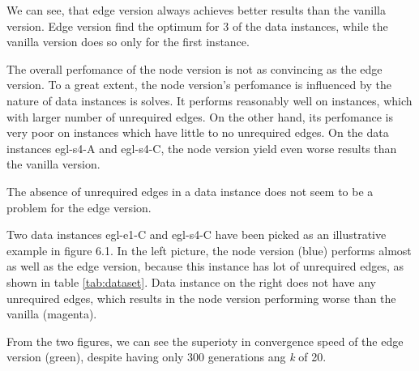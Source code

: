\documentclass[twoside]{ctuthesis}
\theoremstyle{plain}
\theoremstyle{definition}
\theoremstyle{note}
\begin{document}
We can see, that edge version always achieves better results than the vanilla version. Edge version find the optimum for 3 of the data instances, while the vanilla version does so only for the first instance.


The overall perfomance of the node version is not as convincing as the edge version. To a great extent, the node version's perfomance is influenced by the nature of data instances is solves. It performs reasonably well on instances, which with larger number of unrequired edges. On the other hand, its perfomance is very poor on instances which have little to no unrequired edges. On the data instances egl-s4-A and egl-s4-C, the node version yield even worse results than the vanilla version.

The absence of unrequired edges in a data instance does not seem to be a problem for the edge version.

Two data instances egl-e1-C and egl-s4-C have been picked as an illustrative example in figure 6.1. In the left picture, the node version (blue) performs almost as well as the edge version, because this instance has lot of unrequired edges, as shown in table \ref{tab:dataset}. Data instance on the right does not have any unrequired edges, which results in the node version performing worse than the vanilla (magenta). 

From the two figures, we can see the superioty in convergence speed of the edge version (green), despite having only 300 generations ang \emph{k} of 20.




%
%
\end{document}
